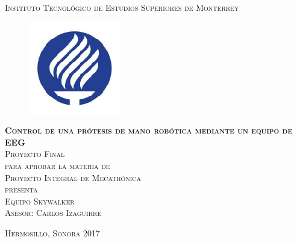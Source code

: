 \documentclass[11pt]{book}
\begin{document}
\begin{titlepage}
\begin{center}

\textsc{\Large Instituto Tecnológico de Estudios Superiores de Monterrey}\\[4em]

\begin{figure}[h]
\begin{center}
\includegraphics{logo_ch.jpg}
\end{center}
\end{figure}

\vspace{4em}

\textsc{\huge \textbf{Control de una prótesis de mano robótica mediante un equipo de EEG}}\\[4em]

\textsc{\large Proyecto Final}\\[1em]

\textsc{para aprobar la materia de}\\[1em]

\textsc{Proyecto Integral de Mecatrónica}\\[1em]

\textsc{presenta}\\[1em]

\textsc{\Large Equipo Skywalker}\\[1em]

\textsc{\large Asesor: Carlos Izaguirre}

\end{center}

\vspace*{\fill}
\textsc{Hermosillo, Sonora \hspace*{\fill} 2017}

\end{titlepage}


\end{document}
